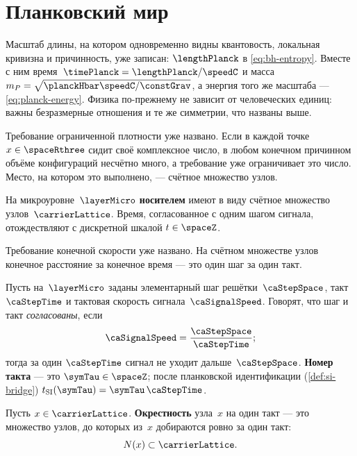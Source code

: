 \section{Планковский мир}
\label{sec:planck-floor}
\label{ch:carrier-object}
\label{sec:carrier-object}

Масштаб длины, на котором одновременно видны
квантовость, локальная кривизна и причинность, уже записан: $\lengthPlanck$ в \eqref{eq:bh-entropy}.
Вместе с ним время~$\timePlanck=\lengthPlanck/\speedC$ и масса~$m_P=\sqrt{\planckHbar \speedC/\constGrav}$,
а энергия того же масштаба --- \eqref{eq:planck-energy}.
Физика по-прежнему не зависит от человеческих единиц:
важны безразмерные отношения и те же симметрии, что названы выше.

Требование ограниченной плотности уже названо.
Если в каждой точке $x\in\spaceRthree$ сидит своё комплексное число,
в любом конечном причинном объёме конфигураций несчётно много,
а требование уже ограничивает это число.
Место, на котором это выполнено, --- счётное множество узлов.

\begin{definition}
\label{def:carrier-sites}
На микроуровне~$\layerMicro$ \textbf{носителем} имеют в виду счётное множество узлов~$\carrierLattice$.
Время, согласованное с одним шагом сигнала, отождествляют с дискретной шкалой $t\in\spaceZ$.
\end{definition}

Требование конечной скорости уже названо.
На счётном множестве узлов конечное расстояние за конечное время --- это один шаг за один такт.

\begin{definition}
\label{def:step-tick}
Пусть на~$\layerMicro$ заданы элементарный шаг решётки~$\caStepSpace$,
такт~$\caStepTime$ и тактовая скорость сигнала~$\caSignalSpeed$.
Говорят, что шаг и такт \emph{согласованы}, если
\begin{equation}
  \caSignalSpeed = \frac{\caStepSpace}{\caStepTime};
\end{equation}
тогда за один $\caStepTime$ сигнал не уходит дальше~$\caStepSpace$.
\textbf{Номер такта} --- это $\symTau\in\spaceZ$;
после планковской идентификации (\cref{def:si-bridge}) $t_{\mathrm{SI}}(\symTau)=\symTau\,\caStepTime$.
\end{definition}

\begin{definition}
\label{def:neighborhood}
Пусть $x\in\carrierLattice$.
\textbf{Окрестность} узла~$x$ на один такт --- это множество узлов, до которых из~$x$
добираются ровно за один такт:
\[
  N(x)\subset\carrierLattice.
\]
\end{definition}

